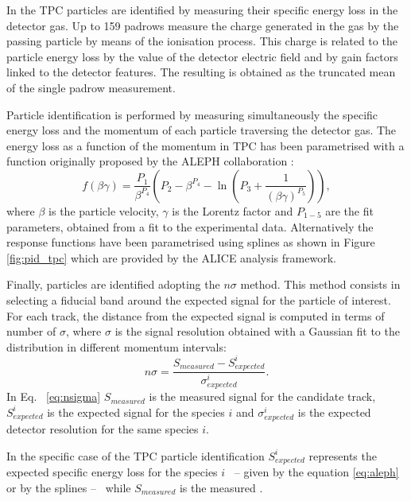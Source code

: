 In the TPC particles are identified by measuring their specific energy loss in the detector gas.
Up to 159 padrows measure the charge generated in the gas by the passing particle by means of the ionisation
process. This charge is related to the particle energy loss by the value of the detector electric
field and by gain factors linked to the detector features. 
The resulting \dedx is obtained as the truncated mean of the single padrow measurement.

Particle identification is performed by measuring simultaneously the specific energy loss \dedx 
and the momentum of each particle traversing the detector gas.
The energy loss as a function of the momentum in TPC has been parametrised with a function originally
proposed by the ALEPH collaboration \cite{aleph}:
\begin{equation} \label{eq:aleph}
    f(\beta \gamma) = \frac{P_{1}}{\beta^{P_{4}}} \left( P_{2} - \beta^{P_{4}}
    - \ln \left( P_{3} + \frac{1}{(\beta \gamma)^{P_{5}}} \right) \right),
\end{equation} 
where $\beta$ is the particle velocity, $\gamma$ is the Lorentz factor and $P_{1-5}$ are the fit
parameters, obtained from a fit to the experimental data.
Alternatively the response functions have been parametrised using splines as shown in Figure
\ref{fig:pid_tpc} which are provided by the ALICE analysis framework.

Finally, particles are identified adopting the $n\sigma$ method.
This method consists in selecting a fiducial band around the expected signal for the particle of
interest.
For each track, the distance from the expected signal is computed in terms of 
number of $\sigma$, where $\sigma$ is the signal resolution obtained with a Gaussian fit to the 
\dedx distribution in different momentum intervals:
\begin{equation} \label{eq:nsigma}
    n\sigma = \frac{S_{measured} - S^{i}_{expected}}{\sigma^{i}_{expected}}.
\end{equation}
In Eq. ~\ref{eq:nsigma} $S_{measured}$ is the measured signal for the candidate track,
$S^{i}_{expected}$ is the expected signal for the species $i$ and $\sigma^{i}_{expected}$ is the
expected detector resolution for the same species $i$.

In the specific case of the TPC particle identification $S^{i}_{expected}$ represents the
expected specific energy loss for the species $i$ \ -- given by the equation \ref{eq:aleph}
or by the splines -- \ while $S_{measured}$ is the measured \dedx.

